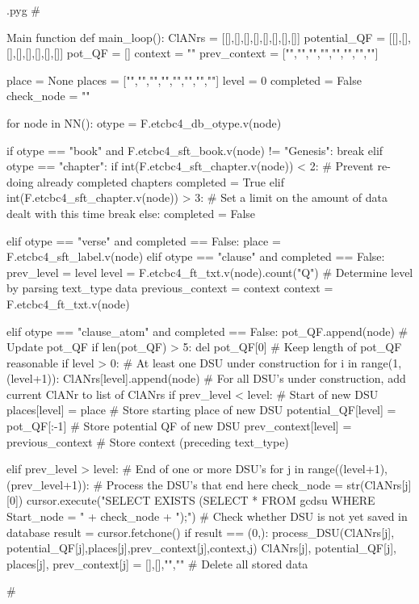 \documentclass{report}
\makeatletter
\newenvironment{python}{%
  \VerbatimEnvironment
  \minted@resetoptions
  \setkeys{minted@opt}{}
      \begin{VerbatimOut}{\jobname.pyg}}
{%
      \end{VerbatimOut}
      \minted@pygmentize{python}
      \DeleteFile{\jobname.pyg}}
\makeatother
\begin{document}
\begin{python}
#{{{ Main function
def main_loop():
    ClANrs =       [[],[],[],[],[],[],[],[]]
    potential_QF = [[],[],[],[],[],[],[],[]]
    pot_QF = []
    context = ""
    prev_context = ["","","","","","","",""]

    place = None
    places =       ["","","","","","","",""]
    level = 0
    completed = False
    check_node = ""

    for node in NN():
        otype = F.etcbc4_db_otype.v(node)

        if otype == "book" and F.etcbc4_sft_book.v(node) != "Genesis":
            break
        elif otype == "chapter":
            if int(F.etcbc4_sft_chapter.v(node)) < 2:    # Prevent re-doing already completed chapters
                completed = True
            elif int(F.etcbc4_sft_chapter.v(node)) > 3:    # Set a limit on the amount of data dealt with this time
                break
            else:
                completed = False

        elif otype == "verse" and completed == False:
            place = F.etcbc4_sft_label.v(node)
        elif otype == "clause" and completed == False:
            prev_level = level
            level = F.etcbc4_ft_txt.v(node).count("Q")      # Determine level by parsing text_type data
            previous_context = context
            context = F.etcbc4_ft_txt.v(node)

        elif otype == "clause_atom" and completed == False:
            pot_QF.append(node)     # Update pot_QF
            if len(pot_QF) > 5:
                del pot_QF[0]       # Keep length of pot_QF reasonable
            if level > 0:           # At least one DSU under construction
                for i in range(1,(level+1)):
                    ClANrs[level].append(node)   # For all DSU's under construction, add current ClANr to list of ClANrs
            if prev_level < level:                  # Start of new DSU
                places[level] = place               # Store starting place of new DSU
                potential_QF[level] = pot_QF[:-1]   # Store potential QF of new DSU
                prev_context[level] = previous_context    # Store context (preceding text_type)

            elif prev_level > level:                # End of one or more DSU's
                for j in range((level+1),(prev_level+1)): # Process the DSU's that end here
                    check_node = str(ClANrs[j][0])
                    cursor.execute("SELECT EXISTS (SELECT * FROM gcdsu WHERE Start_node = " + check_node + ");") # Check whether DSU is not yet saved in database
                    result = cursor.fetchone()
                    if result == (0,):
                        process_DSU(ClANrs[j], potential_QF[j],places[j],prev_context[j],context,j)
                    ClANrs[j], potential_QF[j], places[j], prev_context[j] = [],[],"",""    # Delete all stored data

#}}}
\end{python}
\end{document}
